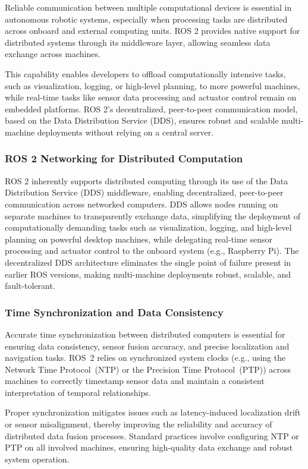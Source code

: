 \documentclass[english,project]{buwthesis}
\begin{document}
Reliable communication between multiple computational devices is essential in autonomous robotic systems, especially when processing tasks are distributed across onboard and external computing units. ROS 2 provides native support for distributed systems through its middleware layer, allowing seamless data exchange across machines.

This capability enables developers to offload computationally intensive tasks, such as visualization, logging, or high-level planning, to more powerful machines, while real-time tasks like sensor data processing and actuator control remain on embedded platforms. ROS 2's decentralized, peer-to-peer communication model, based on the Data Distribution Service (DDS), ensures robust and scalable multi-machine deployments without relying on a central server.
\subsubsection{ROS 2 Networking for Distributed Computation}
ROS 2 inherently supports distributed computing through its use of the Data Distribution Service (DDS) middleware, enabling decentralized, peer-to-peer communication across networked computers. DDS allows nodes running on separate machines to transparently exchange data, simplifying the deployment of computationally demanding tasks such as visualization, logging, and high-level planning on powerful desktop machines, while delegating real-time sensor processing and actuator control to the onboard system (e.g., Raspberry Pi). The decentralized DDS architecture eliminates the single point of failure present in earlier ROS versions, making multi-machine deployments robust, scalable, and fault-tolerant.


\subsubsection{Time Synchronization and Data Consistency}

Accurate time synchronization between distributed computers is essential for ensuring data consistency, sensor fusion accuracy, and precise localization and navigation tasks. ROS~2 relies on synchronized system clocks (e.g., using the Network Time Protocol~(NTP) or the Precision Time Protocol~(PTP)) across machines to correctly timestamp sensor data and maintain a consistent interpretation of temporal relationships. 

Proper synchronization mitigates issues such as latency-induced localization drift or sensor misalignment, thereby improving the reliability and accuracy of distributed data fusion processes. Standard practices involve configuring NTP or PTP on all involved machines, ensuring high-quality data exchange and robust system operation.
\end{document}
